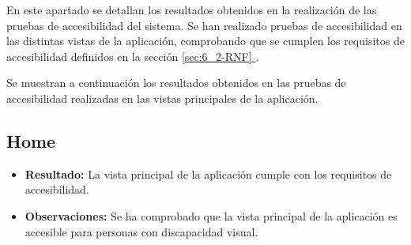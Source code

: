 En este apartado se detallan los resultados obtenidos en la realización de las pruebas de accesibilidad del sistema.
Se han realizado pruebas de accesibilidad en las distintas vistas de la aplicación, comprobando que se cumplen los requisitos de accesibilidad definidos en la sección \hyperlink{sec:6_2-RNF}{\ref*{sec:6_2-RNF} }.

Se muestran a continuación los resultados obtenidos en las pruebas de accesibilidad realizadas en las vistas principales de la aplicación.
\subsection*{Home}
\begin{itemize}
    \item \textbf{Resultado:} La vista principal de la aplicación cumple con los requisitos de accesibilidad.
    \item \textbf{Observaciones:} Se ha comprobado que la vista principal de la aplicación es accesible para personas con discapacidad visual.
\end{itemize}